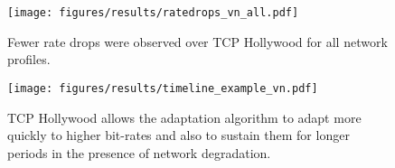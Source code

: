 \begin{figure}
  \centering
  \texttt{[image: figures/results/ratedrops\_vn\_all.pdf]}
  \caption{Fewer rate drops were observed over TCP Hollywood for all network profiles.}
  \label{fig:ratechange_profiles}
\end{figure}

\begin{figure}
  \centering
  \texttt{[image: figures/results/timeline\_example\_vn.pdf]}
  \caption{TCP Hollywood allows the adaptation algorithm to adapt more quickly to higher bit-rates and also to sustain them for longer periods in the presence of network degradation. }
  \label{fig:adaptation_profile}
\end{figure}
